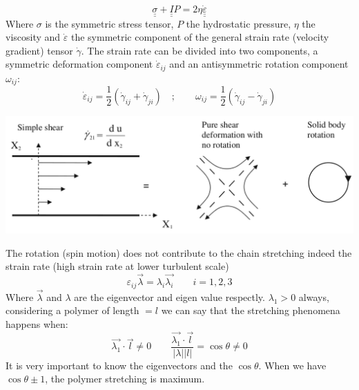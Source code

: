 \documentclass[a0paper,portrait]{baposter}
\begin{document}
\begin{poster}
{{\footnotesize
\[
\underline{\underline\sigma} + \underline{\underline I} P = 2\eta \underline{\underline{\dot{\varepsilon}}} 
\]
}
\footnotesize{Where $\sigma$ is the symmetric stress tensor, $P$ the hydrostatic pressure, $\eta$ the viscosity and $\dot\varepsilon$ the symmetric component of the general strain rate (velocity gradient) tensor $\dot\gamma$. 
The strain rate can be divided into two components,  a symmetric deformation component $\dot\varepsilon_{ij}$ and an antisymmetric rotation component $\omega_{ij}$:
\[
\dot\varepsilon_{ij} = \frac{1}{2} (\dot{\gamma}_{ij}+\dot{\gamma}_{ji})  \quad;\qquad   \omega_{ij} = \frac{1}{2} (\dot{\gamma}_{ij}-\dot{\gamma}_{ji})
\label{eq:epsil}
\]
}
\vspace{-0.24in}
\begin{center}
    \includegraphics[width=.9\linewidth]{shear.png}
\end{center}
\vspace{-0.18in}
\footnotesize{The rotation (spin motion) does not contribute to the chain stretching indeed the strain rate (high strain rate at lower turbulent scale) 
\[
\varepsilon_{ij} \vec{\lambda} = \lambda_i \vec{\lambda_i} \qquad  i=1,2,3
\]
}
\footnotesize{Where $\vec{\lambda}$ and $\lambda$ are the eigenvector and eigen value respectly. $\lambda_1 > 0 $ always, considering a polymer of length $= l$ we can say that the stretching phenomena happens when: %
\[
\vec{\lambda_1} \cdot \vec{l} \neq 0  \qquad \frac{\vec{\lambda_1} \cdot \vec{l}}{|\lambda||l|} = \cos\theta \neq 0 
\]
}
\footnotesize{
It is very important to know the eigenvectors and the $\cos\theta$. When we have
$\cos\theta \pm 1 $, the polymer stretching is maximum.
}

}


\end{poster}
\end{document}
